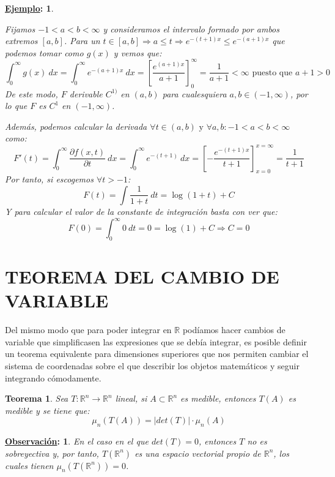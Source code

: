 \documentclass[10pt,a4paper,openright]{book}
\theoremstyle{break}
\newtheorem*{theo}{Teorema}
\newtheorem*{obs}{\underline{Observación}:}
\newtheorem*{ej}{\underline{Ejemplo}:}
\newcommand{\dif}[1]{\ d#1}
\begin{document}
\begin{ej}
\begin{enumerate}
    Fijamos $-1 < a < b < \infty$ y consideramos el intervalo formado por ambos extremos $\left[a, b\right]$. Para un $t \in \left[a, b\right] \Rightarrow a \le t \Rightarrow e^{-\left(t+1\right)x} \le e^{-\left(a+1\right)x}$ que podemos tomar como $g \left(x\right)$ y vemos que:
    $$\int_0^{\infty} g \left(x\right) \dif{x} = \int_0^{\infty} e^{-\left(a+1\right)x} \dif{x} =  \left[\frac{e^{\left(a+1\right)x}}{a+1}\right]_{0}^{\infty} = \frac{1}{a+1} < \infty \text{ puesto que } a+1>0$$
    De este modo, $F$ derivable $C^{1)}$ en $\left(a, b\right)$ para cualesquiera $a,b \in (-1, \infty)$, por lo que $ F$ es $C^1$ en $ \left(-1, \infty\right)$.

    Además, podemos calcular la derivada $\forall t \in \left(a, b\right)\mbox{ y } \forall a, b : -1 < a < b < \infty$ como:
    $$F' \left(t\right) = \int_0^{\infty} \frac{\partial f\left(x, t\right)}{\partial t}  \dif{x} = \int_0^{\infty} e^{-\left(t + 1\right)} \dif{x} = \left[-\frac{e^{- \left(t + 1\right)x}}{t+1}\right]_{x = 0}^{x = \infty} = \frac{1}{t + 1}$$
    Por tanto, si escogemos $\forall t > -1$:
    $$F \left(t\right) = \int \frac{1}{1 + t} \dif{t} = \log \left(1 + t\right) + C$$
    Y para calcular el valor de la constante de integración basta con ver que:
    $$F \left(0\right) = \int_0^{\infty} 0 \dif{t} = 0 = \log \left(1\right) + C\Rightarrow C = 0$$
\end{enumerate}
\end{ej}
 
\section*{TEOREMA DEL CAMBIO DE VARIABLE}
Del mismo modo que para poder integrar en $\mathbb{R}$ podíamos hacer cambios de variable que simplificasen las expresiones que se debía integrar, es posible definir un teorema equivalente para dimensiones superiores que nos permiten cambiar el sistema de coordenadas sobre el que describir los objetos matemáticos y seguir integrando cómodamente.

\begin{theo}
Sea $T: \mathbb{R}^n \rightarrow \mathbb{R}^n$ lineal, si $A \subset \mathbb{R}^n$ es medible, entonces $T \left( A\right)$ es medible y se tiene que:
$$\mu_n \left(T\left(A\right)\right) = \lvert det \left(T\right) \rvert \cdot \mu_n \left(A\right)$$
\end{theo}

\begin{obs}
En el caso en el que $det \left(T\right) = 0$, entonces $T$ no es sobreyectiva y, por tanto, $T \left(\mathbb{R}^n\right)$ es una espacio vectorial propio de $\mathbb{R}^n$, los cuales tienen $\mu_n \left(T \left(\mathbb{R}^n\right)\right) = 0$.
\end{obs}
\end{document}
